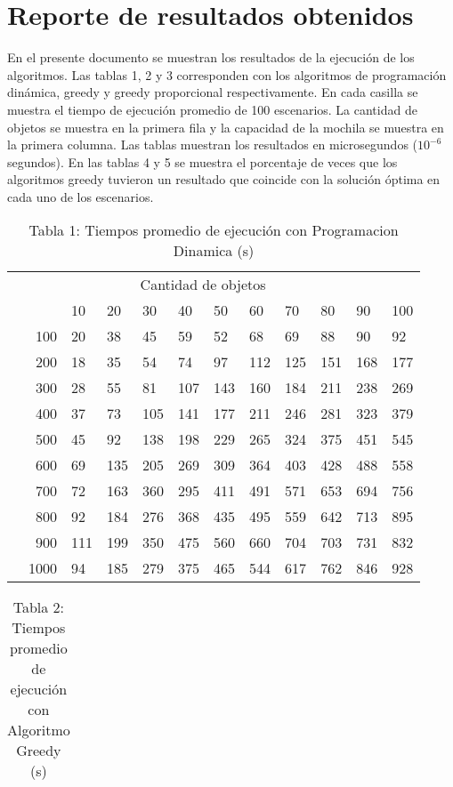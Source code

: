 \documentclass{article}
\begin{document}
\section*{Reporte de resultados obtenidos}
En el presente documento se muestran los resultados de la ejecución de los algoritmos. Las tablas 1, 2 y 3 corresponden con los algoritmos de programación dinámica, greedy y greedy proporcional respectivamente. En cada casilla se muestra el tiempo de ejecución promedio de 100 escenarios. La cantidad de objetos se muestra en la primera fila y la capacidad de la mochila se muestra en la primera columna. Las tablas muestran los resultados en microsegundos ($10^{-6}$ segundos).
En las tablas 4 y 5 se muestra el porcentaje de veces que los algoritmos greedy tuvieron un resultado que coincide con la solución óptima en cada uno de los escenarios.
\begin{center}
\begin{table}[ht]
\centering
\caption*{Tabla 1: Tiempos promedio de ejecución con Programacion Dinamica (\textmu s)}
\label{1}
\begin{tabularx}{0.8\textwidth}{Xr|XXXXXXXXXX}
&\multicolumn{10}{c}{Cantidad de objetos} \\
&&10&20&30&40&50&60&70&80&90&100\\\hline
\parbox[t]{2mm}{}&100&20&38&45&59&52&68&69&88&90&92\\
&200&18&35&54&74&97&112&125&151&168&177\\
&300&28&55&81&107&143&160&184&211&238&269\\
&400&37&73&105&141&177&211&246&281&323&379\\
&500&45&92&138&198&229&265&324&375&451&545\\
&600&69&135&205&269&309&364&403&428&488&558\\
&700&72&163&360&295&411&491&571&653&694&756\\
&800&92&184&276&368&435&495&559&642&713&895\\
&900&111&199&350&475&560&660&704&703&731&832\\
&1000&94&185&279&375&465&544&617&762&846&928\\
\end{tabularx}
\end{table}
\begin{table}[ht]
\centering
\caption*{Tabla 2: Tiempos promedio de ejecución con Algoritmo Greedy (\textmu s)}
\label{2}
\begin{tabularx}{0.8\textwidth}{Xr|XXXXXXXXXX}

\end{tabularx}
\end{table}
\end{center}
\end{document}
